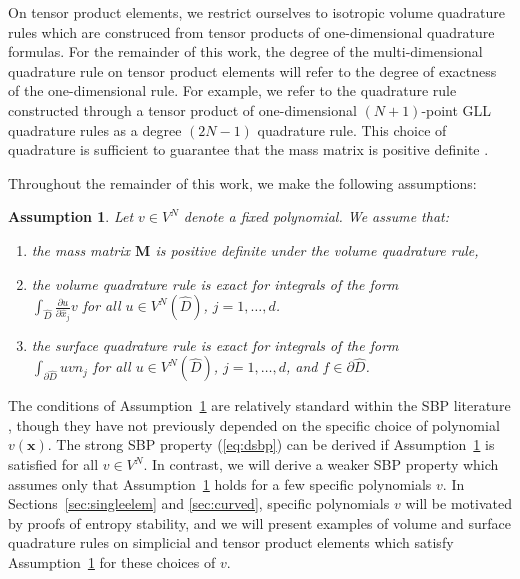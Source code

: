 \documentclass[review]{siamart0216}
\theoremstyle{assumption}
\newtheorem{assumption}{Assumption}
\renewcommand{\hat}[1]{\hat{#1}}
\newcommand{\pd}[2]{\frac{\partial#1}{\partial#2}}
\newcommand{\LRp}[1]{\left( #1 \right)}
\renewcommand{\hat}{\widehat}
\begin{document}
On tensor product elements, we restrict ourselves to isotropic volume quadrature rules which are construced from tensor products of one-dimensional quadrature formulas.  For the remainder of this work, the degree of the multi-dimensional quadrature rule on tensor product elements will refer to the degree of exactness of the one-dimensional rule.  For example, we refer to the quadrature rule constructed through a tensor product of one-dimensional $(N+1)$-point GLL quadrature rules as a degree $(2N-1)$ quadrature rule.  This choice of quadrature is sufficient to guarantee that the mass matrix is positive definite \cite{canuto2007spectral}.  

Throughout the remainder of this work, we make the following assumptions:
\begin{assumption}
\label{ass:quad}
Let $v \in V^{N}$ denote a fixed polynomial.  We assume that: 
\begin{enumerate}
\item the mass matrix $\bm{M}$ is positive definite under the volume quadrature rule,
\item the volume quadrature rule is exact for integrals of the form\\$\int_{\hat{D}} \pd{u}{\hat{x}_j} v$ for all $u \in V^N\LRp{\hat{D}}$, $j = 1,\ldots, d$.
\item the surface quadrature rule is exact for integrals of the form\\$\int_{\partial \hat{D}} u v n_j$ for all $u \in V^N\LRp{\hat{D}}$, $j = 1,\ldots, d$, and $f \in \partial \hat{D}$.  
\end{enumerate}
\end{assumption}

The conditions of Assumption~\ref{ass:quad} are relatively standard within the SBP literature \cite{hicken2016multidimensional, chan2017discretely, crean2018entropy}, though they have not previously depended on the specific choice of polynomial $v(\bm{x})$.   The strong SBP property (\ref{eq:dsbp}) can be derived if Assumption~\ref{ass:quad} is satisfied for all $v \in V^N$.  In contrast, we will derive a weaker SBP property which assumes only that Assumption~\ref{ass:quad} holds for a few specific polynomials $v$.  In Sections~\ref{sec:singleelem} and \ref{sec:curved}, specific polynomials $v$ will be motivated by proofs of entropy stability, and we will present examples of volume and surface quadrature rules on simplicial and tensor product elements which satisfy Assumption~\ref{ass:quad} for these choices of $v$.  
\end{document}
